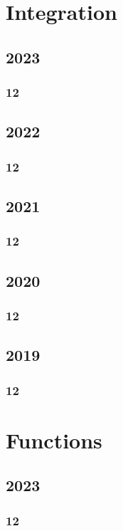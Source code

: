 \documentclass[11pt]{book}
\begin{document}
\chapter{Integration}
\section{2023}
\subsection{12}

\section{2022}
\subsection{12}


\section{2021}
\subsection{12}

\section{2020}
\subsection{12}

\section{2019}
\subsection{12}




\chapter{Functions}
\section{2023}
\subsection{12}

\end{document}
